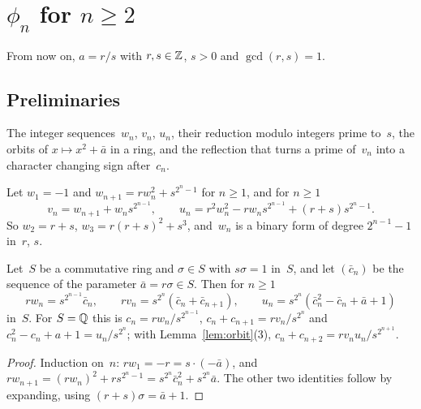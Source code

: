 \chapter{\texorpdfstring{$\phi_n$ for $n \ge 2$}{phi\_n for n >= 2}}
\label{chap:phin}

From now on, $a = r/s$ with $r, s \in \mathbb{Z}$, $s > 0$ and $\gcd(r, s) = 1$.

\section{Preliminaries}
\supporting

The integer sequences~$w_n$, $v_n$, $u_n$, their reduction modulo integers prime to~$s$, the
orbits of $x \mapsto x^2 + \bar a$ in a ring, and the reflection that turns a prime of~$v_n$ into
a character changing sign after~$c_n$.

\begin{definition}[$w_n$, $v_n$, $u_n$]
  \label{def:wseq}
  \leanok
  Let $w_1 = -1$ and $w_{n+1} = r w_n^2 + s^{2^n - 1}$ for $n \ge 1$, and for $n \ge 1$
  \[ v_n = w_{n+1} + w_n s^{2^{n-1}}, \qquad
     u_n = r^2 w_n^2 - r w_n s^{2^{n-1}} + (r + s) s^{2^n - 1}. \]
  So $w_2 = r + s$, $w_3 = r(r+s)^2 + s^3$, and~$w_n$ is a binary form of degree $2^{n-1} - 1$
  in~$r$, $s$.
\end{definition}

\begin{lemma}[Reduction]
  \label{lem:reduction}
  \leanok
  Let~$S$ be a commutative ring and $\sigma \in S$ with $s \sigma = 1$ in~$S$, and let
  $(\bar c_n)$ be the sequence of the parameter $\bar a = r\sigma \in S$. Then for $n \ge 1$
  \[ r w_n = s^{2^{n-1}} \bar c_n, \qquad r v_n = s^{2^n} (\bar c_n + \bar c_{n+1}), \qquad
     u_n = s^{2^n} (\bar c_n^2 - \bar c_n + \bar a + 1) \]
  in~$S$. For $S = \mathbb{Q}$ this is $c_n = r w_n / s^{2^{n-1}}$, $c_n + c_{n+1} = r v_n / s^{2^n}$
  and $c_n^2 - c_n + a + 1 = u_n / s^{2^n}$; with Lemma~\ref{lem:orbit}(3),
  $c_n + c_{n+2} = r v_n u_n / s^{2^{n+1}}$.
\end{lemma}
\begin{proof}
  \leanok
  Induction on~$n$: $r w_1 = -r = s \cdot (-\bar a)$, and
  $r w_{n+1} = (r w_n)^2 + r s^{2^n - 1} = s^{2^n}\bar c_n^2 + s^{2^n} \bar a$. The other two
  identities follow by expanding, using $(r + s)\sigma = \bar a + 1$.
\end{proof}

